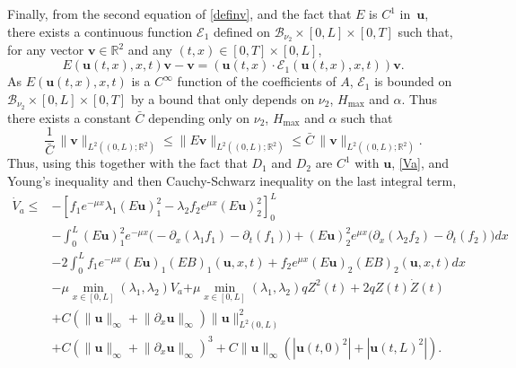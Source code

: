 Finally, from the second equation of \eqref{definv}, and the fact that $E$ is $C^{1}$ in~$\boldsymbol{u}$,
there exists a continuous function {$\mathcal{E}_{1}$} defined on $\mathcal{B}_{\nu_{2}}\times[0,L]\times[0,T]$ such that, for any vector $\boldsymbol{v}\in\mathbb{R}^{2}$ and any $(t,x)\in[0,T]\times[0,L]$,
\begin{equation}
E(\boldsymbol{u}(t,x),x,t)\boldsymbol{v}-\boldsymbol{v}=(\boldsymbol{u}(t,x)\cdot\mathcal{E}_{1}(\boldsymbol{u}(t,x),x,t))\boldsymbol{v}.
\label{recoverv}
\end{equation}
As $E(\boldsymbol{u}(t,x),x,t)$ is a $C^{\infty}$ function of the coefficients of $A$, $\mathcal{E}_{1}$ is bounded on $\mathcal{B}_{\nu_{2}}\times[0,L]\times[0,T]$ by a bound that only depends on $\nu_{2}$, $H_{\max}$ and $\alpha$.
Thus there exists a constant $\bar C$ depending only on $\nu_{2}$, $H_{\max}$ and $\alpha$ such that
\begin{equation}
\frac{1}{\bar C}\,\lVert\boldsymbol{v}\rVert_{{L^{2}((0,L);\mathbb{R}^{2})}}\leq \lVert E\boldsymbol{v}\rVert_{{L^{2}((0,L);\mathbb{R}^{2})}}\leq \bar C\, \lVert\boldsymbol{v}\rVert_{{L^{2}((0,L);\mathbb{R}^{2})}}.
\label{equivinvu}
\end{equation}
Thus, using this together with the fact that $D_{1}$ and $D_{2}$ are $C^{1}$ with $\boldsymbol{u}$, \eqref{Va}, and Young's inequality and then Cauchy-Schwarz inequality on the last integral term,
\begin{equation*}
\begin{split}
\dot V_{a}\leq& -\left[f_{1}e^{-\mu x}\lambda_{1}(E\boldsymbol{u})_{1}^{2}-\lambda_{2}f_{2}e^{\mu x}(E\boldsymbol{u})_{2}^{2}\right]_{0}^{L}\\
&-\int_{0}^{L}(E\boldsymbol{u})_{1}^{2}e^{-\mu x}\bigl(-\partial_{x}(\lambda_{1}f_{1})-\partial_{t}(f_{1})\bigr)+(E\boldsymbol{u})_{2}^{2}e^{\mu x}\bigl(\partial_{x}(\lambda_{2}f_{2})-\partial_{t}(f_{2})\bigr)dx\\
&-2\int_{0}^{L}f_{1}e^{-\mu x}(E\boldsymbol{u})_{1}(EB)_{1}(\boldsymbol{u},x,t)+f_{2}e^{\mu x}(E\boldsymbol{u})_{2}(EB)_{2}(\boldsymbol{u},x,t)dx\\
&-\mu\min\limits_{x\in[0,L]}(\lambda_{1},\lambda_{2})V_{a}{+\mu\min\limits_{x\in[0,L]}(\lambda_{1},\lambda_{2})qZ^{2}(t)}
+2qZ(t)\dot Z(t)\\
&+C\left(\lVert \boldsymbol{u}\rVert_{\infty}+\lVert \partial_{x} \boldsymbol{u}\rVert_{\infty}\right)\lVert\boldsymbol{u} \rVert_{L^{2}(0,L)}^{2}\\
&+C\left(\lVert \boldsymbol{u}\rVert_{\infty}+\lVert \partial_{x} \boldsymbol{u}\rVert_{\infty}\right)^{3}+C\lVert \boldsymbol{u}\rVert_{\infty}(|\boldsymbol{u}(t,0)^{2}|+|\boldsymbol{u}(t,L)^{2}|).
\end{split}
\end{equation*}
